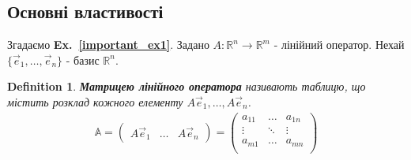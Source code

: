 \documentclass[a4paper, 10pt]{article}
\theoremstyle{theoremdd}
\newtheorem{definition}[theorem]{Definition}
\newcommand\exref[1]{\textbf{Ex.~\ref{#1}}}
\begin{document}
	\subsection{Основні властивості}
	Згадаємо \exref{important_ex1}. Задано $A: \mathbb{R}^n \to \mathbb{R}^m$ - лінійний оператор. Нехай $\{ \vec{e}_1, \dots, \vec{e}_n \}$ - базис $\mathbb{R}^n$.
	\begin{definition}
	\textbf{Матрицею лінійного оператора} називають таблицю, що містить розклад кожного елементу $A \vec{e}_1, \dots, A \vec{e}_n$.
	\begin{align*}
	\mathbb{A} = \begin{pmatrix}
	A\vec{e}_1 & \dots & A\vec{e}_n
\end{pmatrix} = \begin{pmatrix}
	a_{11} & \dots & a_{1n} \\
	\vdots & \ddots & \vdots \\
	a_{m1} & \dots & a_{mn} \\
	\end{pmatrix}
	\end{align*}
	\end{definition}
	
\end{document}
